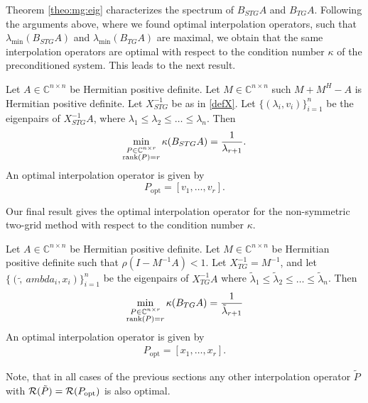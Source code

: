 \documentclass[final]{siamltex}
\newcommand{\beqo}{\begin{eqnarray*}}
\newcommand{\beq}{\begin{eqnarray}}
\newcommand{\eeqo}{\end{eqnarray*}}
\newcommand{\eeq}{\end{eqnarray}}
\numberwithin{equation}{section}
\newcommand{\ran} {{\cal R}}
\newcommand{\Cnr}{\mathbb{C}^{n \times r}}
\newcommand{\inCnn}{\in \mathbb{C}^{n \times n}}
\begin{document}
Theorem \ref{theo:mg:eig} characterizes the  spectrum of $B_{STG}A$ and
$B_{TG}A$. Following the arguments above, where   we found optimal
interpolation operators, such that
$\lambda_{\min}(B_{STG}A)$ and $\lambda_{\min}(B_{TG}A)$ are maximal, we obtain
that the same interpolation operators are optimal with respect to the condition
number $\kappa$ of the preconditioned system. This leads to the next result.

 \begin{theorem}
Let  $A\inCnn$  be Hermitian positive definite. Let $ M \inCnn$ such $M + M^H -
A$ is Hermitian positive definite.
Let $X_{STG}^{-1}$  be as in \eqref{defX}.  
 Let $\{(\lambda_i,v_i)\}_{i=1}^n$ be the eigenpairs of $X_{STG}^{-1}A$, where
$
\lambda_1 \leq \lambda_2 \leq \ldots \leq  \lambda_n $. Then
\beq
\min_{\substack{P \in \Cnr \\ \rank(P)=r}} \kappa(B_{STG}A) =
\frac{1}{\lambda_{r+1}}.
\eeq
An optimal interpolation operator is given by 
\[
P_{\mathrm{opt}} = [v_{1}, \ldots , v_r].
\]
\end{theorem}
  
Our final result gives the optimal interpolation operator for the non-symmetric
two-grid
method with respect to the condition number $\kappa$.

\begin{theorem}
Let  $A\inCnn$  be Hermitian positive definite. Let $ M \inCnn$ be Hermitian
positive definite  such that $\rho(I - M^{-1}A) < 1.$
Let $X_{TG}^{-1} =  M^{-1}$, and let $\{(\tilde, \ ambda_i, x_i)\}_{i=1}^n$ be 
the eigenpairs of $X_{TG}^{-1}A$  where  $
\tilde \lambda_1 \leq \tilde \lambda_2 \leq \ldots \leq  \tilde \lambda_n $. Then
\beqo
\min_{\substack{P \in \Cnr \\ \rank(P)=r}}  \kappa(B_{TG}A) = \frac{1}{\tilde
\lambda_{r+1}}
\eeqo
An optimal interpolation operator is given by 
\beqo
P_{\mathrm{opt}} = [x_{1}, \ldots , x_r].
\eeqo
\end{theorem}

Note, that  in all cases of the previous sections any other interpolation
operator $\tilde P$  with  $\ran (\tilde P) = \ran (P_{\mathrm{opt}})$ is also
optimal.
\end{document}
